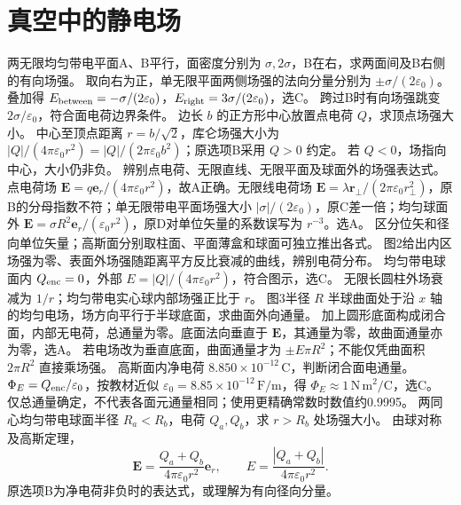 \section{真空中的静电场}
\problemtext 两无限均匀带电平面A、B平行，面密度分别为 $\sigma,2\sigma$，B在右，求两面间及B右侧的有向场强。
\workings 取向右为正，单无限平面两侧场强的法向分量分别为 $\pm\sigma/(2\varepsilon_0)$。叠加得 $E_{\rm between}=-\sigma/(2\varepsilon_0)$，$E_{\rm right}=3\sigma/(2\varepsilon_0)$，选C。
\crosscheck 跨过B时有向场强跳变 $2\sigma/\varepsilon_0$，符合面电荷边界条件。
\problemtext 边长 $b$ 的正方形中心放置点电荷 $Q$，求顶点场强大小。
\workings 中心至顶点距离 $r=b/\sqrt2$，库仑场强大小为 $|Q|/(4\pi\varepsilon_0r^2)=|Q|/(2\pi\varepsilon_0b^2)$；原选项B采用 $Q>0$ 约定。
\crosscheck 若 $Q<0$，场指向中心，大小仍非负。
\problemtext 辨别点电荷、无限直线、无限平面及球面外的场强表达式。
\workings 点电荷场 $\bm E=q\bm e_r/(4\pi\varepsilon_0r^2)$，故A正确。无限线电荷场 $\bm E=\lambda\bm r_\perp/(2\pi\varepsilon_0r_\perp^2)$，原B的分母指数不符；单无限带电平面场强大小 $|\sigma|/(2\varepsilon_0)$，原C差一倍；均匀球面外 $\bm E=\sigma R^2\bm e_r/(\varepsilon_0r^2)$，原D对单位矢量的系数误写为 $r^{-3}$。选A。
\crosscheck 区分位矢和径向单位矢量；高斯面分别取柱面、平面薄盒和球面可独立推出各式。
\problemtext 图2给出内区场强为零、表面外场强随距离平方反比衰减的曲线，辨别电荷分布。
\workings 均匀带电球面内 $Q_{\rm enc}=0$，外部 $E=|Q|/(4\pi\varepsilon_0r^2)$，符合图示，选C。
\crosscheck 无限长圆柱外场衰减为 $1/r$；均匀带电实心球内部场强正比于 $r$。
\problemtext 图3半径 $R$ 半球曲面处于沿 $x$ 轴的均匀电场，场方向平行于半球底面，求曲面外向通量。
\workings 加上圆形底面构成闭合面，内部无电荷，总通量为零。底面法向垂直于 $\bm E$，其通量为零，故曲面通量亦为零，选A。
\crosscheck 若电场改为垂直底面，曲面通量才为 $\pm E\pi R^2$；不能仅凭曲面积 $2\pi R^2$ 直接乘场强。
\problemtext 高斯面内净电荷 $8.850\times10^{-12}\,\mathrm C$，判断闭合面电通量。
\workings $\Phi_E=Q_{\rm enc}/\varepsilon_0$，按教材近似 $\varepsilon_0=8.85\times10^{-12}\,\mathrm{F/m}$，得 $\Phi_E\approx1\,\mathrm{N\,m^2/C}$，选C。
\crosscheck 仅总通量确定，不代表各面元通量相同；使用更精确常数时数值约0.9995。
\problemtext 两同心均匀带电球面半径 $R_a<R_b$，电荷 $Q_a,Q_b$，求 $r>R_b$ 处场强大小。
\workings 由球对称及高斯定理，
\[
\bm E=\frac{Q_a+Q_b}{4\pi\varepsilon_0r^2}\bm e_r,\qquad
E=\frac{|Q_a+Q_b|}{4\pi\varepsilon_0r^2}.
\]
原选项B为净电荷非负时的表达式，或理解为有向径向分量。
